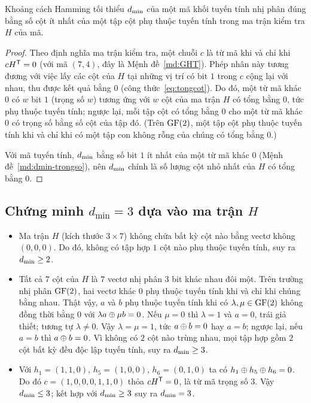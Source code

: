 \begin{dinhly}\label{dl:khoangcach}
Khoảng cách Hamming tối thiểu $d_{\min}$ của một mã khối tuyến tính nhị phân đúng
bằng số cột ít nhất của một tập cột phụ thuộc tuyến tính trong ma trận kiểm tra
$H$ của mã.
\end{dinhly}
\begin{proof}
Theo định nghĩa ma trận kiểm tra, một chuỗi $c$ là từ mã khi và chỉ khi
$cH^{\mathsf{T}} = 0$ (với mã $(7,4)$, đây là Mệnh đề~\ref{md:GHT}).
Phép nhân này tương đương với việc lấy các cột của $H$ tại những vị trí có bit
$1$ trong $c$ cộng lại với nhau, thu được kết quả bằng $0$
(công thức~\eqref{eq:tongcot}). Do đó, một từ mã khác $0$ có $w$ bit $1$
(trọng số $w$) tương ứng với $w$ cột của ma trận $H$ có tổng bằng $0$, tức phụ
thuộc tuyến tính; ngược lại, mỗi tập cột có tổng bằng $0$ cho một từ mã khác $0$
có trọng số bằng số cột của tập đó. (Trên $\mathrm{GF}(2)$, một tập cột phụ thuộc tuyến
tính khi và chỉ khi có một tập con không rỗng của chúng có tổng bằng $0$.)

Với mã tuyến tính, $d_{\min}$ bằng số bit $1$ ít nhất của một từ mã khác $0$
(Mệnh đề~\ref{md:dmin-trongso}), nên $d_{\min}$ chính là số lượng cột nhỏ nhất của
$H$ có tổng bằng $0$.
\end{proof}

\subsection{Chứng minh \texorpdfstring{$d_{\min} = 3$}{dmin = 3} dựa vào ma trận \texorpdfstring{$H$}{H}}
\label{ss:2.4.2}

\begin{itemize}
  \item Ma trận $H$ (kích thước $3 \times 7$) không chứa bất kỳ cột nào bằng
        vectơ không $(0,0,0)$. Do đó, không có tập hợp $1$ cột nào phụ thuộc
        tuyến tính, suy ra $d_{\min} \ge 2$.
  \item Tất cả $7$ cột của $H$ là $7$ vectơ nhị phân $3$ bit khác nhau đôi một.
        Trên trường nhị phân $\mathrm{GF}(2)$, hai vectơ khác $0$ phụ thuộc tuyến tính khi
        và chỉ khi chúng bằng nhau. Thật vậy, $a$ và $b$ phụ thuộc tuyến tính
        khi có $\lambda, \mu \in \mathrm{GF}(2)$ không đồng thời bằng $0$ với
        $\lambda a \oplus \mu b = 0$. Nếu $\mu = 0$ thì $\lambda = 1$ và
        $a = 0$, trái giả thiết; tương tự $\lambda \neq 0$. Vậy
        $\lambda = \mu = 1$, tức $a \oplus b = 0$ hay $a = b$; ngược lại, nếu
        $a = b$ thì $a \oplus b = 0$. Vì không có $2$ cột nào trùng nhau, mọi
        tập hợp gồm $2$ cột bất kỳ đều độc lập tuyến tính, suy ra
        $d_{\min} \ge 3$.
  \item Với $h_1 = (1,1,0)$, $h_5 = (1,0,0)$, $h_6 = (0,1,0)$ ta có
        $h_1 \oplus h_5 \oplus h_6 = 0$. Do đó $c = (1,0,0,0,1,1,0)$ thỏa
        $cH^{\mathsf{T}} = 0$, là từ mã trọng số $3$. Vậy $d_{\min} \le 3$; kết hợp với
        $d_{\min} \ge 3$ suy ra $d_{\min} = 3$.
\end{itemize}

